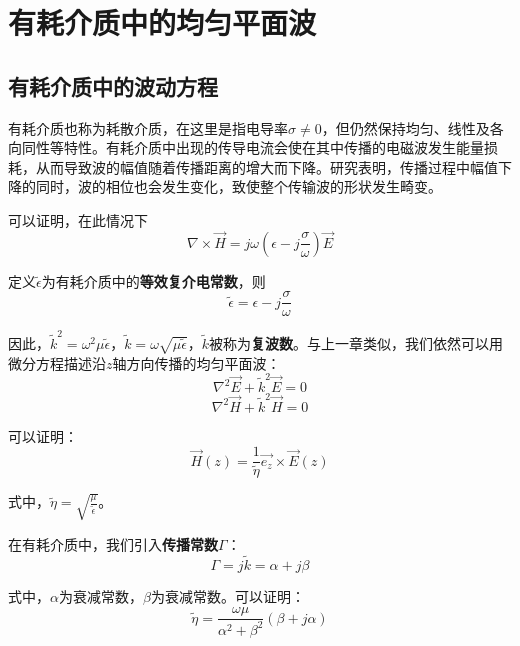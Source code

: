 \documentclass[UTF8,a4paper,11pt]{article}
\begin{document}
\section{有耗介质中的均匀平面波}
\subsection{有耗介质中的波动方程}
有耗介质也称为耗散介质，在这里是指电导率$\sigma\ne0$，但仍然保持均匀、线性及各向同性等特性。有耗介质中出现的传导电流会使在其中传播的电磁波发生能量损耗，从而导致波的幅值随着传播距离的增大而下降。研究表明，传播过程中幅值下降的同时，波的相位也会发生变化，致使整个传输波的形状发生畸变。

可以证明，在此情况下
\begin{equation}
\nabla\times\overrightarrow{H}=j\omega(\epsilon-j\frac{\sigma}{\omega})\overrightarrow{E}
\end{equation}

定义$\widetilde{\epsilon}$为有耗介质中的\textbf{等效复介电常数}，则
\begin{equation}
\widetilde{\epsilon}=\epsilon-j\frac{\sigma}{\omega}
\end{equation}

因此，$\widetilde{k}^2=\omega^2\mu\widetilde{\epsilon}$，$\widetilde{k}=\omega\sqrt{\mu\widetilde{\epsilon}}$，$\widetilde{k}$被称为\textbf{复波数}。与上一章类似，我们依然可以用微分方程描述沿$z$轴方向传播的均匀平面波：
\begin{equation}
\nabla^2\overrightarrow{E}+\widetilde{k}^2\overrightarrow{E}=0
\end{equation}
\begin{equation}
\nabla^2\overrightarrow{H}+\widetilde{k}^2\overrightarrow{H}=0
\end{equation}

可以证明：
\begin{equation}
\overrightarrow{H}(z)=\frac{1}{\widetilde{\eta}}\overrightarrow{e_z}\times\overrightarrow{E}(z)
\end{equation}

式中，$\widetilde{\eta}=\sqrt{\frac{\mu}{\widetilde{\epsilon}}}$。

在有耗介质中，我们引入\textbf{传播常数}$\Gamma$：
\begin{equation}
\Gamma=j\widetilde{k}=\alpha+j\beta
\end{equation}

式中，$\alpha$为衰减常数，$\beta$为衰减常数。可以证明：
\begin{equation}
\widetilde{\eta}=\frac{\omega\mu}{\alpha^2+\beta^2}(\beta+j\alpha)
\end{equation}
\end{document}
